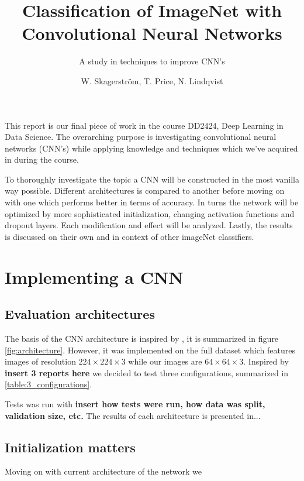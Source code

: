 \documentclass{kthreport}
\title{Classification of ImageNet with Convolutional Neural Networks}
\subtitle{A study in techniques to improve CNN's}
\author{W. Skagerström, T. Price, N. Lindqvist}
\begin{document}
\maketitle


This report is our final piece of work in the course DD2424, Deep Learning in Data Science. The overarching purpose is investigating convolutional neural networks (CNN's) while applying knowledge and techniques which we've acquired in during the course.

To thoroughly investigate the topic a CNN will be constructed in the most vanilla way possible. Different architectures is compared to another before moving on with one which performs better in terms of accuracy. In turns the network will be optimized by more sophisticated initialization, changing activation functions and dropout layers. Each modification and effect will be analyzed. Lastly, the results is discussed on their own and in context of other imageNet classifiers.


\section{Implementing a CNN}

\subsection{Evaluation architectures}

The basis of the CNN architecture is inspired by \cite{NIPS2012_4824}, it is summarized in figure \ref{fig:architecture}. However, it was implemented on the full dataset which features images of resolution $224\times224\times3$ while our images are $64\times64\times3$. Inspired by \textbf{insert 3 reports here} we decided to test three configurations, summarized in \ref{table:3_configurations}.






Tests was run with \textbf{insert how tests were run, how data was split, validation size, etc.} The results of each architecture is presented in...

\subsection{Initialization matters}

Moving on with current architecture of the network we
\end{document}
